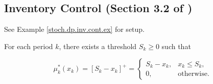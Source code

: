 \subsection{Inventory Control (Section 3.2 of \citet{v1_bertsekas2012dynamic} )}

See Example \ref{stoch.dp.inv.cont.ex} for setup.

\begin{theorem}\label{stoch.dp.order.up.to.opt}

For each period \(k\), there exists a threshold \(S_k \geq 0\) such that 

\[
\mu_k^*(x_k) = [S_k - x_k]^+  = \begin{cases}
S_k - x_k, & x_k \leq S_k, \\
0, & \text{otherwise.}
\end{cases}
\]

\end{theorem}


